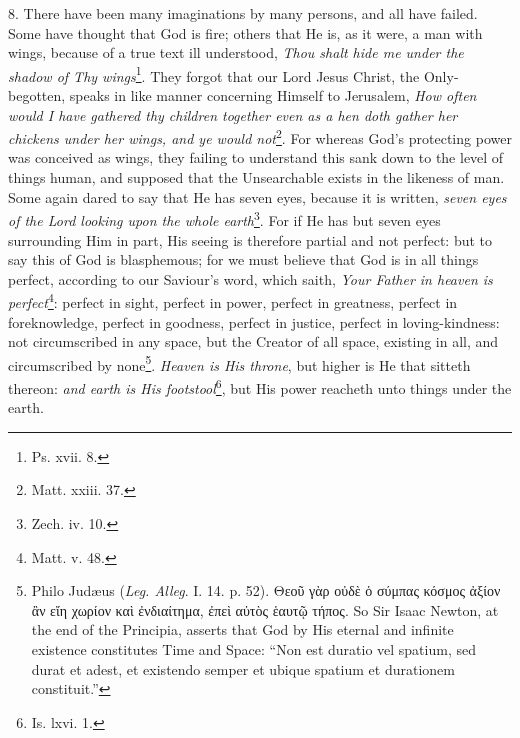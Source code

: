 8. There have been many imaginations by many persons, and all have failed. Some have thought that God is fire; others that He is, as it were, a man with wings, because of a true text ill understood, \emph{Thou shalt hide me under the shadow of Thy wings}\footnote{Ps. xvii. 8.}. They forgot that our Lord Jesus Christ, the Only-begotten, speaks in like manner concerning Himself to Jerusalem, \emph{How often would I have gathered thy children together even as a hen doth gather her chickens under her wings, and ye would not}\footnote{Matt. xxiii. 37.}. For whereas God’s protecting power was conceived as wings, they failing to understand this sank down to the level of things human, and supposed that the Unsearchable exists in the likeness of man. Some again dared to say that He has seven eyes, because it is written, \emph{seven eyes of the Lord looking upon the whole earth}\footnote{Zech. iv. 10.}. For if He has but seven eyes surrounding Him in part, His seeing is therefore partial and not perfect: but to say this of God is blasphemous; for we must believe that God is in all things perfect, according to our Saviour’s word, which saith, \emph{Your Father in heaven is perfect}\footnote{Matt. v. 48.}: perfect in sight, perfect in power, perfect in greatness, perfect in foreknowledge, perfect in goodness, perfect in justice, perfect in loving-kindness: not circumscribed in any space, but the Creator of all space, existing in all, and circumscribed by none\footnote{Philo Judæus (\emph{Leg. Alleg}. I. 14. p. 52). \textgreek{Θεοῦ γὰρ οὐδὲ ὁ σύμπας κόσμος ἀξίον ἂν εἴη χωρίον καὶ ἐνδιαίτημα, ἐπεὶ αὐτὸς ἑαυτῷ τήπος}. So Sir Isaac Newton, at the end of the Principia, asserts that God by His eternal and infinite existence constitutes Time and Space: “Non est duratio vel spatium, sed durat et adest, et existendo semper et ubique spatium et durationem constituit.”}. \emph{Heaven is His throne}, but higher is He that sitteth thereon: \emph{and earth is His footstool}\footnote{Is. lxvi. 1.}, but His power reacheth unto things under the earth.

